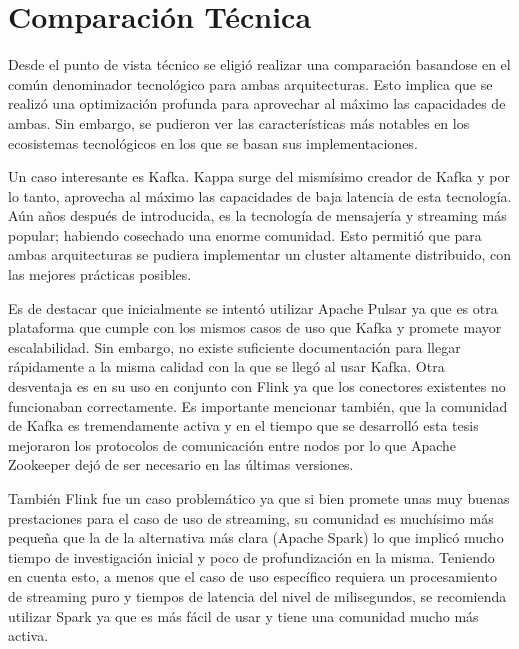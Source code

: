 \section{Comparación Técnica}

Desde el punto de vista técnico se eligió realizar una comparación basandose en el común denominador tecnológico para ambas arquitecturas.
Esto implica que se realizó una optimización profunda para aprovechar al máximo las capacidades de ambas. 
Sin embargo, se pudieron ver las características más notables en los ecosistemas tecnológicos en los que se basan sus implementaciones. \newline

Un caso interesante es Kafka. Kappa surge del mismísimo creador de Kafka y por lo tanto, aprovecha al máximo las capacidades de baja latencia de esta tecnología.
Aún años después de introducida, es la tecnología de mensajería y streaming más popular; habiendo cosechado una enorme comunidad. 
Esto permitió que para ambas arquitecturas se pudiera implementar un cluster altamente distribuido, con las mejores prácticas posibles. \newline

Es de destacar que inicialmente se intentó utilizar Apache Pulsar ya que es otra plataforma que cumple con los mismos casos de uso que Kafka y promete mayor escalabilidad. 
Sin embargo, no existe suficiente documentación para llegar rápidamente a la misma calidad con la que se llegó al usar Kafka. 
Otra desventaja es en su uso en conjunto con Flink ya que los conectores existentes no funcionaban correctamente. 
Es importante mencionar también, que la comunidad de Kafka es tremendamente activa 
y en el tiempo que se desarrolló esta tesis mejoraron los protocolos de comunicación entre nodos por lo que Apache Zookeeper dejó de ser necesario en las últimas versiones.\newline

También Flink fue un caso problemático ya que si bien promete unas muy buenas prestaciones para el caso de uso de streaming, 
su comunidad es muchísimo más pequeña que la de la alternativa más clara (Apache Spark) lo que implicó mucho tiempo de investigación inicial y poco de profundización en la misma. 
Teniendo en cuenta esto, a menos que el caso de uso específico requiera un procesamiento de streaming puro y tiempos de latencia del nivel de milisegundos,
se recomienda utilizar Spark ya que es más fácil de usar y tiene una comunidad mucho más activa.\newline

